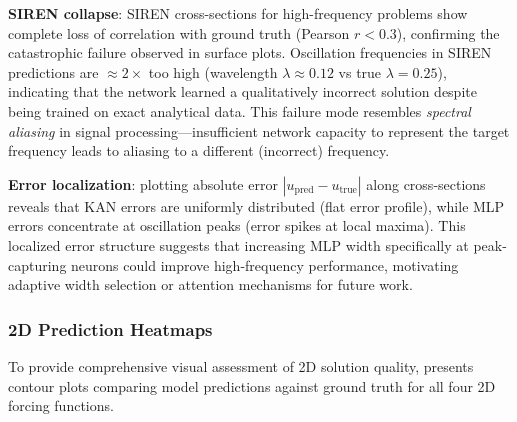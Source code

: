 \documentclass[11pt,a4paper]{article}
\begin{document}
\textbf{SIREN collapse}: SIREN cross-sections for high-frequency problems show complete loss of correlation with ground truth (Pearson $r < 0.3$), confirming the catastrophic failure observed in surface plots. Oscillation frequencies in SIREN predictions are $\approx 2\times$ too high (wavelength $\lambda \approx 0.12$ vs true $\lambda = 0.25$), indicating that the network learned a qualitatively incorrect solution despite being trained on exact analytical data. This failure mode resembles \emph{spectral aliasing} in signal processing—insufficient network capacity to represent the target frequency leads to aliasing to a different (incorrect) frequency.

\textbf{Error localization}: plotting absolute error $|u_{\text{pred}} - u_{\text{true}}|$ along cross-sections reveals that KAN errors are uniformly distributed (flat error profile), while MLP errors concentrate at oscillation peaks (error spikes at local maxima). This localized error structure suggests that increasing MLP width specifically at peak-capturing neurons could improve high-frequency performance, motivating adaptive width selection or attention mechanisms for future work.

\subsubsection{2D Prediction Heatmaps}

To provide comprehensive visual assessment of 2D solution quality,  presents contour plots comparing model predictions against ground truth for all four 2D forcing functions.
\end{document}
